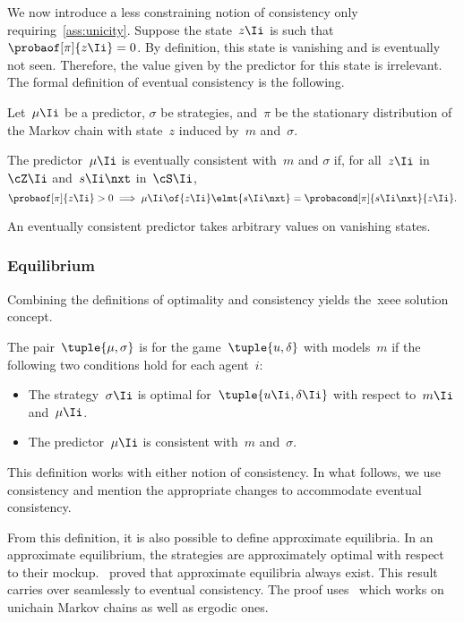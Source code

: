 We now introduce a less constraining notion of consistency only requiring~\cref{ass:unicity}.
Suppose the state~\(z\Ii\) is such that~\(\probaof[\pi]{z\Ii} = 0\).
By definition, this state is vanishing and is eventually not seen.
Therefore, the value given by the predictor for this state is irrelevant.
The formal definition of eventual consistency is the following.

\begin{definition}
Let~\(\mu\Ii\) be a predictor, \(\sigma\) be strategies, and~\(\pi\) be the stationary distribution of the Markov chain with state~\(z\) induced by~\(m\) and~\(\sigma\).

The predictor~\(\mu\Ii\) is eventually consistent with~\(m\)  and \(\sigma\) if, for all~\(z\Ii\) in~\(\cZ\Ii\) and~\(s\Ii\nxt\) in~\(\cS\Ii\),
\[
\probaof[\pi]{z\Ii} > 0
\implies
\mu\Ii \of{z\Ii} \elmt{s\Ii\nxt}
=
\probacond[\pi]{s\Ii\nxt}{z\Ii}
.
\]
\end{definition}

An eventually consistent predictor takes arbitrary values on vanishing states.

\subsubsection{Equilibrium}

Combining the definitions of optimality and consistency yields the~\ac{xeee} solution concept.

\begin{definition}[Equilibrium]
The pair~\(\tuple{\mu, \sigma}\) is  for the game~\(\tuple{u, \delta}\) with models~\(m\) if the following two conditions hold for each agent~\(i\):
\begin{itemize}
\item The strategy~\(\sigma\Ii\) is optimal for~\(\tuple{u\Ii, \delta\Ii}\) with respect to~\(m\Ii\) and~\(\mu\Ii\).
\item The predictor~\(\mu\Ii\) is consistent with~\(m\) and~\(\sigma\).
\end{itemize}
\end{definition}

This definition works with either notion of consistency.
In what follows, we use consistency and mention the appropriate changes to accommodate eventual consistency.

From this definition, it is also possible to define approximate equilibria.
In an approximate equilibrium, the strategies are approximately optimal with respect to their mockup.
\cite{dudebout_shamma:2012}~proved that approximate equilibria always exist.
This result carries over seamlessly to eventual consistency.
The proof uses~\cite[Theorem~4.1]{meyer:1980} which works on unichain Markov chains as well as ergodic ones.

